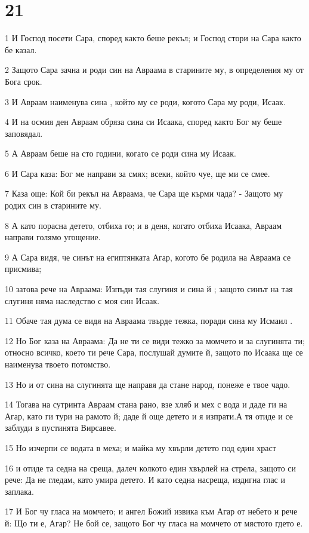\chapter{21}

\par 1 И Господ посети Сара, според както беше рекъл; и Господ стори на Сара както бе казал.
\par 2 Защото Сара зачна и роди син на Авраама в старините му, в определения му от Бога срок.
\par 3 И Авраам наименува сина , който му се роди, когото Сара му роди, Исаак.
\par 4 И на осмия ден Авраам обряза сина си Исаака, според както Бог му беше заповядал.
\par 5 А Авраам беше на сто години, когато се роди сина му Исаак.
\par 6 И Сара каза: Бог ме направи за смях; всеки, който чуе, ще ми се смее.
\par 7 Каза още: Кой би рекъл на Авраама, че Сара ще кърми чада? - Защото му родих син в старините му.
\par 8 А като порасна детето, отбиха го; и в деня, когато отбиха Исаака, Авраам направи голямо угощение.
\par 9 А Сара видя, че синът на египтянката Агар, когото бе родила на Авраама се присмива;
\par 10 затова рече на Авраама: Изпъди тая слугиня и сина й ; защото синът на тая слугиня няма наследство с моя син Исаак.
\par 11 Обаче тая дума се видя на Авраама твърде тежка, поради сина му Исмаил .
\par 12 Но Бог каза на Авраама: Да не ти се види тежко за момчето и за слугинята ти; относно всичко, което ти рече Сара, послушай думите й, защото по Исаака ще се наименува твоето потомство.
\par 13 Но и от сина на слугинята ще направя да стане народ, понеже е твое чадо.
\par 14 Тогава на сутринта Авраам стана рано, взе хляб и мех с вода и даде ги на Агар, като ги тури на рамото й; даде й още детето и я изпрати.А тя отиде и се заблуди в пустинята Вирсавее.
\par 15 Но изчерпи се водата в меха; и майка му хвърли детето под един храст
\par 16 и отиде та седна на среща, далеч колкото един хвърлей на стрела, защото си рече: Да не гледам, като умира детето. И като седна насреща, издигна глас и заплака.
\par 17 И Бог чу гласа на момчето; и ангел Божий извика към Агар от небето и рече й: Що ти е, Агар? Не бой се, защото Бог чу гласа на момчето от мястото гдето е.
